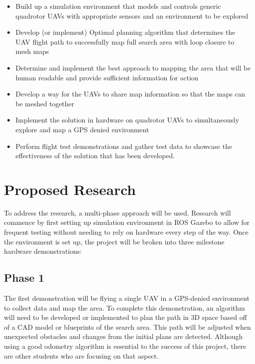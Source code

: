 \documentclass[12pt, letterpaper]{article}
\begin{document}
\begin{itemize}

	\item Build up a simulation environment that models and controls generic quadrotor UAVs with appropriate sensors and an environment to be explored

	\item Develop (or implement) Optimal planning algorithm that determines the UAV flight path to successfully map full search area with loop closure to mesh maps  

	\item Determine and implement the best approach to mapping the area that will be human readable and provide sufficient information for action
	
	\item Develop a way for the UAVs to share map information so that the maps can be meshed together 

	\item Implement the solution in hardware on quadrotor UAVs to simultaneously explore and map a GPS denied environment
	
	\item Perform flight test demonstrations and gather test data to showcase the effectiveness of the solution that has been developed.

\end{itemize}

\section{Proposed Research}

To address the research, a multi-phase approach will be used. Research will commence by first setting up simulation environment in ROS Gazebo to allow for frequent testing without needing to rely on hardware every step of the way. Once the environment is set up, the project will be broken into three milestone hardware demonstrations: 

\subsection{Phase 1}
The first demonstration will be flying a single UAV in a GPS-denied environment to collect data and map the area. To complete this demonstration, an algorithm will need to be developed or implemented to plan the path in 3D space based off of a CAD model or blueprints of the search area. This path will be adjusted when unexpected obstacles and changes from the initial plans are detected. Although using a good odometry algorithm is essential to the success of this project, there are other students who are focusing on that aspect. 
\end{document}
